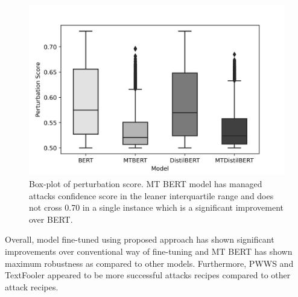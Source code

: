 \documentclass[%
	BCOR=8mm, %
	DIV=12,
	toc=bibliography, %
	toc=listof, %
	oneside, %
	egregdoesnotlikesansseriftitles, %
	]{scrbook}
\begin{document}
\begin{figure}[H]
    \centering
    \includegraphics[width=.6\linewidth]{img/PertScoreDist}
    \caption[Box-plot of perturbation score]{\small Box-plot of perturbation score. MT BERT model has managed attacks confidence score in the leaner interquartile range and does not cross 0.70 in a single instance which is a significant improvement over BERT.}
    \label{fig:pertscoredist}
\end{figure}
 Overall, model fine-tuned using proposed approach has shown significant improvements over conventional way of fine-tuning and MT BERT has shown maximum robustness as compared to other models. Furthermore, PWWS and TextFooler appeared to be more successful attacks recipes compared to other attack recipes. 

\end{document}
